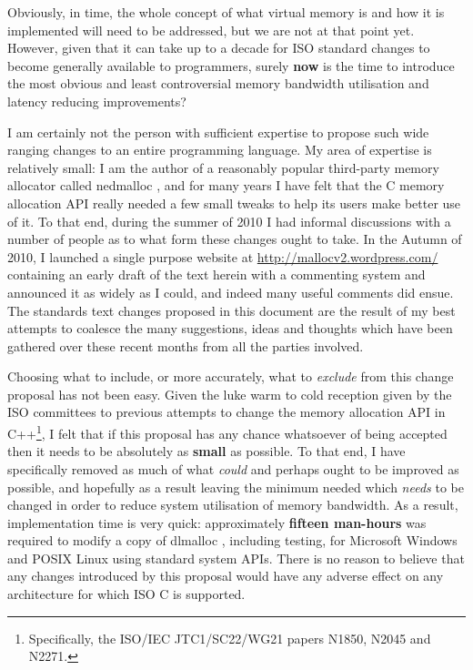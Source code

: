 \documentclass[wd]{isov2}
\begin{document}
{\begin{foreword}
Obviously, in time, the whole concept of what virtual memory is and how it is implemented will need to be addressed, but we are not at that point yet. However, given that it can take up to a decade for ISO standard changes to become generally available to programmers, surely \textbf{now} is the time to introduce the most obvious and least controversial memory bandwidth utilisation and latency reducing improvements?

I am certainly not the person with sufficient expertise to propose such wide ranging changes to an entire programming language. My area of expertise is relatively small: I am the author of a reasonably popular third-party memory allocator called nedmalloc , and for many years I have felt that the C memory allocation API really needed a few small tweaks to help its users make better use of it. To that end, during the summer of 2010 I had informal discussions with a number of people as to what form these changes ought to take. In the Autumn of 2010, I launched a single purpose website at \url{http://mallocv2.wordpress.com/} containing an early draft of the text herein with a commenting system and announced it as widely as I could, and indeed many useful comments did ensue. The standards text changes proposed in this document are the result of my best attempts to coalesce the many suggestions, ideas and thoughts which have been gathered over these recent months from all the parties involved.

Choosing what to include, or more accurately, what to \emph{exclude} from this change proposal has not been easy. Given the luke warm to cold reception given by the ISO committees to previous attempts to change the memory allocation API in C++\footnote{Specifically, the ISO/IEC JTC1/SC22/WG21 papers N1850, N2045 and N2271.}, I felt that if this proposal has any chance whatsoever of being accepted then it needs to be absolutely as \textbf{small} as possible. To that end, I have specifically removed as much of what \emph{could} and perhaps ought to be improved as possible, and hopefully as a result leaving the minimum needed which \emph{needs} to be changed in order to reduce system utilisation of memory bandwidth. As a result, implementation time is very quick: approximately \textbf{fifteen man-hours} was required to modify a copy of dlmalloc , including testing, for Microsoft Windows and POSIX Linux using standard system APIs. There is no reason to believe that any changes introduced by this proposal would have any adverse effect on any architecture for which ISO C is supported.


\end{foreword}}
\end{document}
